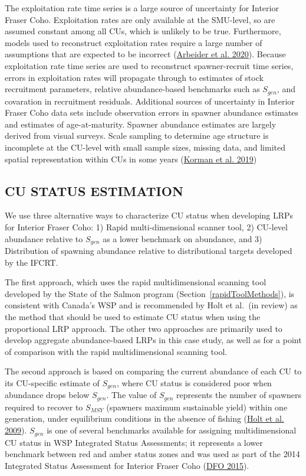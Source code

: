 \documentclass[11pt]{book}
\begin{document}
The exploitation rate time series is a large source of uncertainty for Interior Fraser Coho. Exploitation rates are only available at the SMU-level, so are assumed constant among all CUs, which is unlikely to be true. Furthermore, models used to reconstruct exploitation rates require a large number of assumptions that are expected to be incorrect (\protect\hyperlink{ref-arbeiderInteriorFraserCoho2020}{Arbeider et al. 2020}). Because exploitation rate time series are used to reconstruct spawner-recruit time series, errors in exploitation rates will propagate through to estimates of stock recruitment parameters, relative abundance-based benchmarks such as \(S_{gen}\), and covaration in recruitment residuals. Additional sources of uncertainty in Interior Fraser Coho data sets include observation errors in spawner abundance estimates and estimates of age-at-maturity. Spawner abundance estimates are largely derived from visual surveys. Scale sampling to determine age structure is incomplete at the CU-level with small sample sizes, missing data, and limited spatial representation within CUs in some years (\protect\hyperlink{ref-kormanEvaluationFrameworkAssessing2019}{Korman et al. 2019})

\hypertarget{cu-status-estimation}{%
\subsection{CU STATUS ESTIMATION}\label{cu-status-estimation}}

We use three alternative ways to characterize CU status when developing LRPs for Interior Fraser Coho: 1) Rapid multi-dimensional scanner tool, 2) CU-level abundance relative to \(S_{gen}\) as a lower benchmark on abundance, and 3) Distribution of spawning abundance relative to distributional targets developed by the IFCRT.

The first approach, which uses the rapid multidimensional scanning tool developed by the State of the Salmon program (Section~\ref{rapidToolMethods}), is consistent with Canada's WSP and is recommended by Holt et al.~(in review) as the method that should be used to estimate CU status when using the proportional LRP approach. The other two approaches are primarily used to develop aggregate abundance-based LRPs in this case study, as well as for a point of comparison with the rapid multidimensional scanning tool.

The second approach is based on comparing the current abundance of each CU to its CU-specific estimate of \(S_{gen}\), where CU status is considered poor when abundance drops below \(S_{gen}\). The value of \(S_{gen}\) represents the number of spawners required to recover to \(S_{MSY}\) (spawners maximum sustainable yield) within one generation, under equilibrium conditions in the absence of fishing (\protect\hyperlink{ref-holtIndicatorsStatusBenchmarks2009}{Holt et al. 2009}). \(S_{gen}\) is one of several benchmarks available for assigning multidimensional CU status in WSP Integrated Status Assessments; it represents a lower benchmark between red and amber status zones and was used as part of the 2014 Integrated Status Assessment for Interior Fraser Coho (\protect\hyperlink{ref-dfoWildSalmonPolicy2015}{DFO 2015}).
\end{document}
